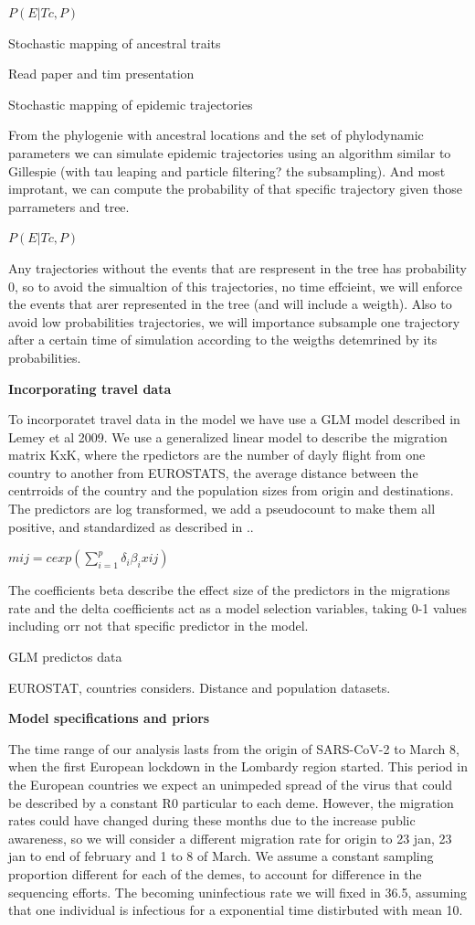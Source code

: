 $P(E | Tc, P)$

Stochastic mapping of ancestral traits

Read paper and tim presentation

Stochastic mapping of epidemic trajectories

From the phylogenie with ancestral locations and the set of phylodynamic parameters we can simulate epidemic trajectories using an algorithm similar to Gillespie (with tau leaping and particle filtering? the subsampling). And most improtant, we can compute the probability of that specific trajectory given those parrameters and tree. 

$P(E|Tc, P)$

Any trajectories without the events that are respresent in the tree has probability 0, so to avoid the simualtion of this trajectories, no time effcieint, we will enforce the events that arer represented in the tree (and will include a weigth). Also to avoid low probabilities trajectories, we will importance subsample one trajectory after a certain time of simulation according to the weigths detemrined by its probabilities. 



\textbf{Incorporating travel data}

To incorporatet travel data in the model we have use a GLM model described in Lemey et al 2009. We use a generalized linear model to describe the migration matrix KxK, where the rpedictors are the number of dayly flight from one country to another from EUROSTATS, the average distance between the centrroids of the country and the population sizes from origin and destinations. The predictors are log transformed, we add a pseudocount to make them all positive, and standardized as described in ..

$mij = c exp(\sum_{i = 1}^p \delta_i \beta_i xij)$

The coefficients beta describe the effect size of the predictors in the migrations rate and the delta coefficients act as a model selection variables, taking 0-1 values including orr not that specific predictor in the model.

GLM predictos data

EUROSTAT, countries considers. Distance and population datasets.


\textbf{Model specifications and priors}

The time range of our analysis lasts from the origin of SARS-CoV-2 to March 8, when the first European lockdown in the Lombardy region started. This period in the European countries we expect an unimpeded spread of the virus that could be described by a constant R0 particular to each deme. However, the migration rates could have changed during these months due to the increase public awareness, so we will consider a different migration rate for origin to 23 jan, 23 jan to end of february and 1 to 8 of March. We assume a constant sampling proportion different for each of the demes, to account for difference in the sequencing efforts. The becoming uninfectious rate we will fixed in 36.5, assuming that one individual is infectious for a exponential time distirbuted with mean 10.

